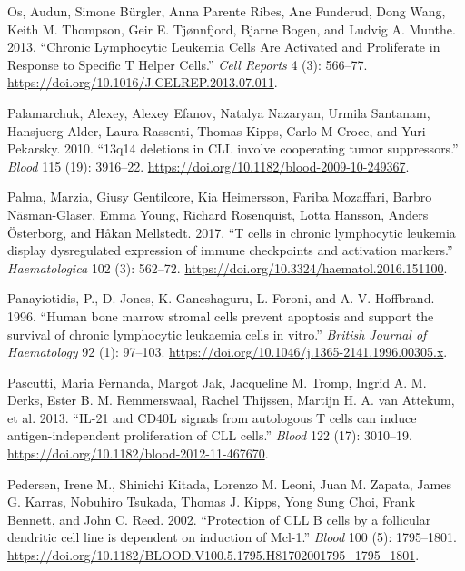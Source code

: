 \documentclass[11pt, a4paper, twosided]{book}
\newenvironment{CSLReferences}%
  {}%
  {\par}
\begin{document}
\begin{CSLReferences}{1}{0}
\leavevmode{}%
Os, Audun, Simone Bürgler, Anna Parente Ribes, Ane Funderud, Dong Wang, Keith M. Thompson, Geir E. Tjønnfjord, Bjarne Bogen, and Ludvig A. Munthe. 2013. {``{Chronic Lymphocytic Leukemia Cells Are Activated and Proliferate in Response to Specific T Helper Cells}.''} \emph{Cell Reports} 4 (3): 566--77. \url{https://doi.org/10.1016/J.CELREP.2013.07.011}.

\leavevmode{}%
Palamarchuk, Alexey, Alexey Efanov, Natalya Nazaryan, Urmila Santanam, Hansjuerg Alder, Laura Rassenti, Thomas Kipps, Carlo M Croce, and Yuri Pekarsky. 2010. {``{13q14 deletions in CLL involve cooperating tumor suppressors}.''} \emph{Blood} 115 (19): 3916--22. \url{https://doi.org/10.1182/blood-2009-10-249367}.

\leavevmode{}%
Palma, Marzia, Giusy Gentilcore, Kia Heimersson, Fariba Mozaffari, Barbro Näsman-Glaser, Emma Young, Richard Rosenquist, Lotta Hansson, Anders Österborg, and Håkan Mellstedt. 2017. {``{T cells in chronic lymphocytic leukemia display dysregulated expression of immune checkpoints and activation markers}.''} \emph{Haematologica} 102 (3): 562--72. \url{https://doi.org/10.3324/haematol.2016.151100}.

\leavevmode{}%
Panayiotidis, P., D. Jones, K. Ganeshaguru, L. Foroni, and A. V. Hoffbrand. 1996. {``{Human bone marrow stromal cells prevent apoptosis and support the survival of chronic lymphocytic leukaemia cells in vitro}.''} \emph{British Journal of Haematology} 92 (1): 97--103. \url{https://doi.org/10.1046/j.1365-2141.1996.00305.x}.

\leavevmode{}%
Pascutti, Maria Fernanda, Margot Jak, Jacqueline M. Tromp, Ingrid A. M. Derks, Ester B. M. Remmerswaal, Rachel Thijssen, Martijn H. A. van Attekum, et al. 2013. {``{IL-21 and CD40L signals from autologous T cells can induce antigen-independent proliferation of CLL cells}.''} \emph{Blood} 122 (17): 3010--19. \url{https://doi.org/10.1182/blood-2012-11-467670}.

\leavevmode{}%
Pedersen, Irene M., Shinichi Kitada, Lorenzo M. Leoni, Juan M. Zapata, James G. Karras, Nobuhiro Tsukada, Thomas J. Kipps, Yong Sung Choi, Frank Bennett, and John C. Reed. 2002. {``{Protection of CLL B cells by a follicular dendritic cell line is dependent on induction of Mcl-1}.''} \emph{Blood} 100 (5): 1795--1801. \url{https://doi.org/10.1182/BLOOD.V100.5.1795.H81702001795_1795_1801}.


\end{CSLReferences}
\end{document}
